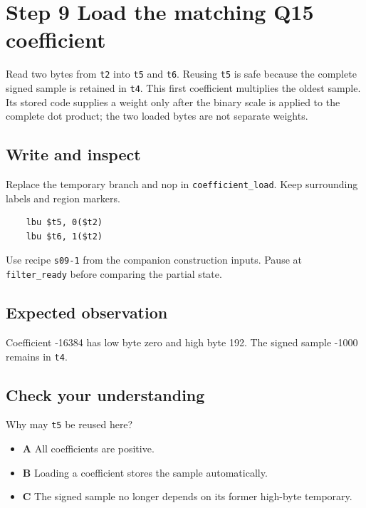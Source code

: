 \section{Step 9 Load the matching Q15 coefficient}\label{fir-s09}

Read two bytes from \texttt{t2} into \texttt{t5} and \texttt{t6}. Reusing \texttt{t5} is safe because the complete signed sample is retained in \texttt{t4}. This first coefficient multiplies the oldest sample. Its stored code supplies a weight only after the binary scale is applied to the complete dot product; the two loaded bytes are not separate weights.

\subsection{Write and inspect}
Replace the temporary branch and nop in \texttt{coefficient\_load}. Keep surrounding labels and region markers.

\begin{verbatim}
    lbu $t5, 0($t2)
    lbu $t6, 1($t2)
\end{verbatim}
Use recipe \texttt{s09-1} from the companion construction inputs. Pause at \texttt{filter\_ready} before comparing the partial state.

\subsection{Expected observation}
Coefficient -16384 has low byte zero and high byte 192. The signed sample -1000 remains in \texttt{t4}.

\subsection{Check your understanding}
Why may \texttt{t5} be reused here?

\begin{itemize}
\item \textbf{A} All coefficients are positive.
\item \textbf{B} Loading a coefficient stores the sample automatically.
\item \textbf{C} The signed sample no longer depends on its former high-byte temporary.
\end{itemize}
